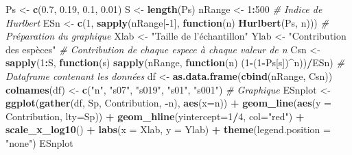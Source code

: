 \documentclass[
  11pt,
  french,
  a4paper,
  extrafontsizes,onecolumn,openright
  ]{memoir}
\newenvironment{Shaded}{\begin{snugshade}}{\end{snugshade}}
\newcommand{\CommentTok}[1]{\textcolor[rgb]{0.56,0.35,0.01}{\textit{#1}}}
\newcommand{\ControlFlowTok}[1]{\textcolor[rgb]{0.13,0.29,0.53}{\textbf{#1}}}
\newcommand{\DataTypeTok}[1]{\textcolor[rgb]{0.13,0.29,0.53}{#1}}
\newcommand{\DecValTok}[1]{\textcolor[rgb]{0.00,0.00,0.81}{#1}}
\newcommand{\FloatTok}[1]{\textcolor[rgb]{0.00,0.00,0.81}{#1}}
\newcommand{\KeywordTok}[1]{\textcolor[rgb]{0.13,0.29,0.53}{\textbf{#1}}}
\newcommand{\NormalTok}[1]{#1}
\newcommand{\OperatorTok}[1]{\textcolor[rgb]{0.81,0.36,0.00}{\textbf{#1}}}
\newcommand{\StringTok}[1]{\textcolor[rgb]{0.31,0.60,0.02}{#1}}
\begin{document}
\begin{Shaded}
\begin{Highlighting}[]
\NormalTok{Ps <-}\StringTok{ }\KeywordTok{c}\NormalTok{(}\FloatTok{0.7}\NormalTok{, }\FloatTok{0.19}\NormalTok{, }\FloatTok{0.1}\NormalTok{, }\FloatTok{0.01}\NormalTok{)}
\NormalTok{S <-}\StringTok{ }\KeywordTok{length}\NormalTok{(Ps)}
\NormalTok{nRange <-}\StringTok{ }\DecValTok{1}\OperatorTok{:}\DecValTok{500}
\CommentTok{# Indice de Hurlbert}
\NormalTok{ESn <-}\StringTok{ }\KeywordTok{c}\NormalTok{(}\DecValTok{1}\NormalTok{, }\KeywordTok{sapply}\NormalTok{(nRange[}\OperatorTok{-}\DecValTok{1}\NormalTok{], }\ControlFlowTok{function}\NormalTok{(n) }\KeywordTok{Hurlbert}\NormalTok{(Ps, n)))}
\CommentTok{# Préparation du graphique}
\NormalTok{Xlab <-}\StringTok{ "Taille de l'échantillon"}
\NormalTok{Ylab <-}\StringTok{ "Contribution des espèces"}
\CommentTok{# Contribution de chaque espece à chaque valeur de n}
\NormalTok{Csn <-}\StringTok{ }\KeywordTok{sapply}\NormalTok{(}\DecValTok{1}\OperatorTok{:}\NormalTok{S, }\ControlFlowTok{function}\NormalTok{(s) }\KeywordTok{sapply}\NormalTok{(nRange, }
              \ControlFlowTok{function}\NormalTok{(n) (}\DecValTok{1}\OperatorTok{-}\NormalTok{(}\DecValTok{1}\OperatorTok{-}\NormalTok{Ps[s])}\OperatorTok{^}\NormalTok{n))}\OperatorTok{/}\NormalTok{ESn)}
\CommentTok{# Dataframe contenant les données}
\NormalTok{df <-}\StringTok{ }\KeywordTok{as.data.frame}\NormalTok{(}\KeywordTok{cbind}\NormalTok{(nRange, Csn))}
\KeywordTok{colnames}\NormalTok{(df) <-}\StringTok{ }\KeywordTok{c}\NormalTok{(}\StringTok{"n"}\NormalTok{, }\StringTok{"s07"}\NormalTok{, }\StringTok{"s019"}\NormalTok{, }\StringTok{"s01"}\NormalTok{, }\StringTok{"s001"}\NormalTok{)}
\CommentTok{# Graphique}
\NormalTok{ESnplot <-}\StringTok{ }\KeywordTok{ggplot}\NormalTok{(}\KeywordTok{gather}\NormalTok{(df, Sp, Contribution, }\OperatorTok{-}\NormalTok{n), }\KeywordTok{aes}\NormalTok{(}\DataTypeTok{x=}\NormalTok{n)) }\OperatorTok{+}
\StringTok{  }\KeywordTok{geom_line}\NormalTok{(}\KeywordTok{aes}\NormalTok{(}\DataTypeTok{y =}\NormalTok{ Contribution, }\DataTypeTok{lty=}\NormalTok{Sp)) }\OperatorTok{+}
\StringTok{  }\KeywordTok{geom_hline}\NormalTok{(}\DataTypeTok{yintercept=}\DecValTok{1}\OperatorTok{/}\DecValTok{4}\NormalTok{, }\DataTypeTok{col=}\StringTok{"red"}\NormalTok{) }\OperatorTok{+}
\StringTok{  }\KeywordTok{scale_x_log10}\NormalTok{() }\OperatorTok{+}
\StringTok{  }\KeywordTok{labs}\NormalTok{(}\DataTypeTok{x =}\NormalTok{ Xlab, }\DataTypeTok{y =}\NormalTok{ Ylab) }\OperatorTok{+}
\StringTok{  }\KeywordTok{theme}\NormalTok{(}\DataTypeTok{legend.position =} \StringTok{"none"}\NormalTok{)}
\NormalTok{ESnplot}
\end{Highlighting}
\end{Shaded}
\end{document}
